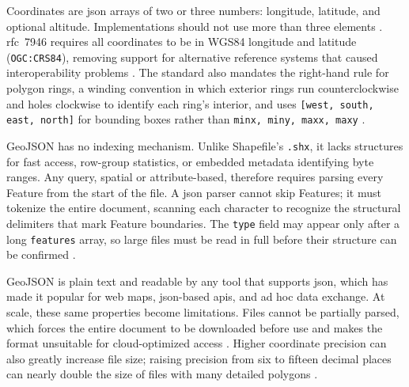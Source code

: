 Coordinates are \acrshort{json} arrays of two or three numbers: longitude, latitude, and optional altitude. Implementations should not use more than three elements \parencite{butler2016_rfc7946_geojson_format}. \acrshort{rfc}~7946 requires all coordinates to be in WGS84 longitude and latitude (\texttt{OGC:CRS84}), removing support for alternative reference systems that caused interoperability problems \parencite{butler2016_rfc7946_geojson_format}. The standard also mandates the right-hand rule for polygon rings, a winding convention in which exterior rings run counterclockwise and holes clockwise to identify each ring's interior, and uses \texttt{[west, south, east, north]} for bounding boxes rather than \texttt{minx, miny, maxx, maxy} \parencite{butler2016_rfc7946_geojson_format}.

GeoJSON has no indexing mechanism. Unlike Shapefile's \texttt{.shx}, it lacks structures for fast access, row-group statistics, or embedded metadata identifying byte ranges. Any query, spatial or attribute-based, therefore requires parsing every Feature from the start of the file. A \acrshort{json} parser cannot skip Features; it must tokenize the entire document, scanning each character to recognize the structural delimiters that mark Feature boundaries. The \texttt{type} field may appear only after a long \texttt{features} array, so large files must be read in full before their structure can be confirmed \parencite{butler2016_rfc7946_geojson_format}.

GeoJSON is plain text and readable by any tool that supports \acrshort{json}, which has made it popular for web maps, \acrshort{json}-based \acrshort{api}s, and ad hoc data exchange. At scale, these same properties become limitations. Files cannot be partially parsed, which forces the entire document to be downloaded before use and makes the format unsuitable for cloud-optimized access \parencite{cngfoundation2024_cloud_optimized_geospatial_formats_guide}. Higher coordinate precision can also greatly increase file size; raising precision from six to fifteen decimal places can nearly double the size of files with many detailed polygons \parencite{butler2016_rfc7946_geojson_format}.

